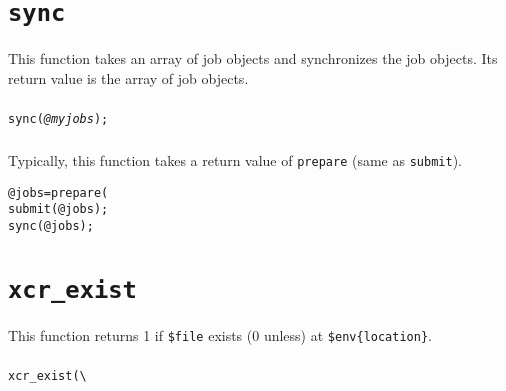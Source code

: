 \documentclass[a4paper,10pt]{report}
\def\|{\verb|} %|
\begin{document}
\section{\texttt{sync}}

This function takes an array of job objects and synchronizes the job objects.
Its return value is the array of job objects.

\subsubsection{\format}

\begin{boxnote}
\begin{alltt}
sync(\textit{@myjobs});
\end{alltt}
\end{boxnote}
\vspace{\baselineskip}

\subsubsection{\example}

Typically, this function takes a return value of \texttt{prepare}
(same as \texttt{submit}).
\begin{boxnote}
\begin{alltt}
@jobs = prepare(%mytemplate);
submit(@jobs);
sync(@jobs);
\end{alltt}
\end{boxnote}
\vspace{\baselineskip}

\section{\texttt{xcr\_exist}}

This function returns 1 if \texttt{\$file} exists (0 unless) at
\texttt{\$env\{location\}}.

\subsubsection{\format}

\begin{boxnote}
\begin{alltt}
xcr_exist(\|\|%\textit{env}, $file);
\end{alltt}
\end{boxnote}
\vspace{\baselineskip}
\end{document}
